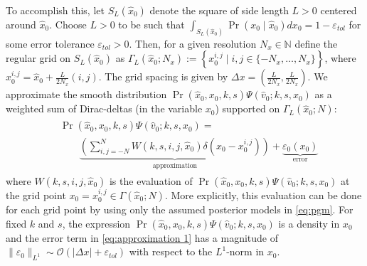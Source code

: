 \documentclass[letterpaper,10pt,conference]{ieeeconf}
\begin{document}
 To accomplish this, let $S_L(\hat{x}_0)$ denote the square of side length $L>0$ centered around $\hat{x}_0$.
 Choose  $L>0$ to be such that $\int_{S_L(\hat{x}_0)} \Pr( x_0 \mid \hat{x}_0) dx_0 = 1 - \varepsilon_{tol}$ for some error tolerance $\varepsilon_{tol}>0$.
 Then, for a given resolution $N_x \in \mathbb{N}$ define the regular grid on $S_L(\hat{x}_0)$ as $\Gamma_L( \hat{x}_0 ; N_x ) := \left\{ x_0^{i,j} \mid i,j \in \{ -N_x,\dots,N_x \} \right\}$, where $x_0^{i,j} = \hat{x}_0 + \frac{L}{2N_x}(i,j)$.
 The grid spacing is given by $\Delta x = ( \frac{L}{2N_x}, \frac{L}{2N_x} )$.
We approximate the smooth distribution $\Pr(\hat{x}_0, x_0, k, s) \Psi( \hat{v}_0 ; k, s, x_0 )$ as a weighted sum of Dirac-deltas (in the variable $x_0$) supported on $\Gamma_L( \hat{x}_0;N)$:
\begin{align}
	\begin{split}
		&\Pr(\hat{x}_0, x_0, k, s) \Psi( \hat{v}_0 ; k, s, x_0 ) = \\
		&\qquad \underbrace{\left( \sum_{i,j=-N}^{N} W(k,s,i,j,\hat{x}_0) \delta( x_0 - x_0^{i,j} ) \right)}_{\text{approximation}}
		+ \underbrace{ \varepsilon_0(x_0) }_{\text{error}}
	\end{split}
	\label{eq:approximation 1}
\end{align}
where $W(k,s,i,j,\hat{x}_0)$ is the evaluation of $\Pr(\hat{x}_0, x_0, k, s) \Psi( \hat{v}_0 ; k, s, x_0 )$ at the grid point $x_0 = x_0^{i,j} \in \Gamma( \hat{x}_0; N)$.
More explicitly, this evaluation can be done for each grid point by using only the assumed posterior models in \eqref{eq:pgm}.
For fixed $k$ and $s$, the expression $\Pr(\hat{x}_0, x_0, k, s) \Psi( \hat{v}_0 ; k, s, x_0 )$ is a density in $x_0$ and the error term in \eqref{eq:approximation 1} has a magnitude of $\| \varepsilon_0 \|_{L^1} \sim \mathcal{O}( | \Delta x |  + \varepsilon_{tol} )$ with respect to the $L^1$-norm in $x_0$.
\end{document}
